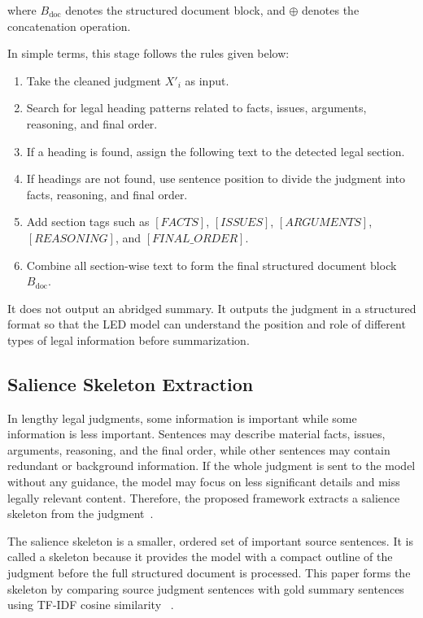 \documentclass[11pt, a4paper]{article}
\theoremstyle{plain}%
\theoremstyle{remark}%
\theoremstyle{definition}%
\begin{document}
where \(B_{\text{doc}}\) denotes the structured document block, and \(\oplus\) denotes the concatenation operation.

In simple terms, this stage follows the rules given below:

\begin{enumerate}
\item Take the cleaned judgment \(X'_i\) as input.
\item Search for legal heading patterns related to facts, issues, arguments, reasoning, and final order.
\item If a heading is found, assign the following text to the detected legal section.
\item If headings are not found, use sentence position to divide the judgment into facts, reasoning, and final order.
\item Add section tags such as \([FACTS]\), \([ISSUES]\), \([ARGUMENTS]\), \([REASONING]\), and \([FINAL\_ORDER]\).
\item Combine all section-wise text to form the final structured document block \(B_{\text{doc}}\).
\end{enumerate}

It does not output an abridged summary. It outputs the judgment in a structured format so that the LED model can understand the position and role of different types of legal information before summarization.

\subsection{Salience Skeleton Extraction}

In lengthy legal judgments, some information is important while some information is less important. Sentences may describe material facts, issues, arguments, reasoning, and the final order, while other sentences may contain redundant or background information. If the whole judgment is sent to the model without any guidance, the model may focus on less significant details and miss legally relevant content. Therefore, the proposed framework extracts a salience skeleton from the judgment~\cite{b11,b18}.

The salience skeleton is a smaller, ordered set of important source sentences. It is called a skeleton because it provides the model with a compact outline of the judgment before the full structured document is processed. This paper forms the skeleton by comparing source judgment sentences with gold summary sentences using TF-IDF cosine similarity ~\cite{b11,b18}.
\end{document}
